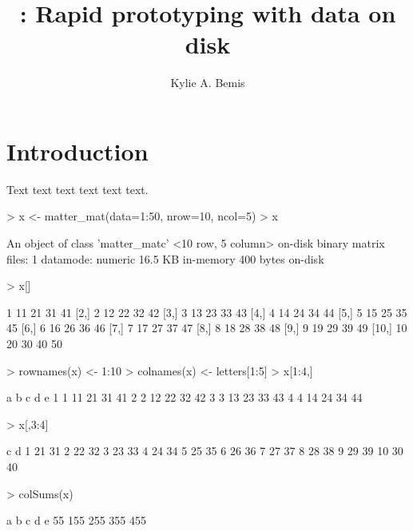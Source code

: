 \documentclass[a4paper]{article}
\title{\Rpackage{matter}: Rapid prototyping with data on disk}
\author{Kylie A. Bemis}
\begin{document}


\maketitle

\tableofcontents

\section{Introduction}


Text text text text text text.

\begin{Schunk}
\begin{Sinput}
> x <- matter_mat(data=1:50, nrow=10, ncol=5)
> x
\end{Sinput}
\begin{Soutput}
An object of class 'matter_matc'
  <10 row, 5 column> on-disk binary matrix
    files: 1
    datamode: numeric
    16.5 KB in-memory
    400 bytes on-disk
\end{Soutput}
\begin{Sinput}
> x[]
\end{Sinput}
\begin{Soutput}
      [,1] [,2] [,3] [,4] [,5]
 [1,]    1   11   21   31   41
 [2,]    2   12   22   32   42
 [3,]    3   13   23   33   43
 [4,]    4   14   24   34   44
 [5,]    5   15   25   35   45
 [6,]    6   16   26   36   46
 [7,]    7   17   27   37   47
 [8,]    8   18   28   38   48
 [9,]    9   19   29   39   49
[10,]   10   20   30   40   50
\end{Soutput}
\begin{Sinput}
> rownames(x) <- 1:10
> colnames(x) <- letters[1:5]
> x[1:4,]
\end{Sinput}
\begin{Soutput}
  a  b  c  d  e
1 1 11 21 31 41
2 2 12 22 32 42
3 3 13 23 33 43
4 4 14 24 34 44
\end{Soutput}
\begin{Sinput}
> x[,3:4]
\end{Sinput}
\begin{Soutput}
    c  d
1  21 31
2  22 32
3  23 33
4  24 34
5  25 35
6  26 36
7  27 37
8  28 38
9  29 39
10 30 40
\end{Soutput}
\begin{Sinput}
> colSums(x)
\end{Sinput}
\begin{Soutput}
  a   b   c   d   e 
 55 155 255 355 455 
\end{Soutput}

\end{Schunk}
\end{document}
